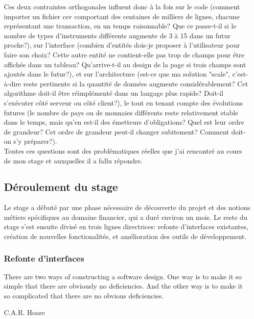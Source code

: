 \documentclass[a4paper,french,12pt]{article}
\begin{document}
		Ces deux contraintes orthogonales influent donc à la fois sur le code (comment importer un fichier csv comportant des centaines de milliers de lignes, chacune représentant une transaction, en un temps raisonnable? Que ce passe-t-il si le nombre de types d'instruments différents augmente de 3 à 15 dans un futur proche?), sur l'interface (combien d'entités dois-je proposer à l'utilisateur pour faire son choix? Cette autre entité ne contient-elle pas trop de champs pour être affichée dans un tableau? Qu'arrive-t-il au design de la page si trois champs sont ajoutés dans le futur?), et sur l'architecture (est-ce que ma solution "scale", c'est-à-dire reste pertinente si la quantité de données augmente considérablement? Cet algorithme doit-il être réimplémenté dans un langage plus rapide? Doit-il s'exécuter côté serveur ou côté client?), le tout en tenant compte des évolutions futures (le nombre de pays ou de monnaies différents reste relativement stable dans le temps, mais qu'en est-il des émetteurs d'obligations? Quel est leur ordre de grandeur? Cet ordre de grandeur peut-il changer subitement? Comment doit-on s'y préparer?).~\\
		
		Toutes ces questions sont des problématiques réelles que j'ai rencontré au cours de mon stage et auxquelles il a fallu répondre.


	\subsection{Déroulement du stage}
		Le stage a débuté par une phase nécessaire de découverte du projet et des notions métiers spécifiques au domaine financier, qui a duré environ un mois. Le reste du stage s'est ensuite divisé en trois lignes directrices: refonte d'interfaces existantes, création de nouvelles fonctionalités, et amélioration des outils de développement.
	
		\subsubsection{Refonte d'interfaces}
		\epigraph{There are two ways of constructing a software design.  One way is to make it so simple that there are obviously no deficiencies. And the other way is to make it so complicated that there are no obvious deficiencies.}{C.A.R. Hoare}
		
\end{document}
